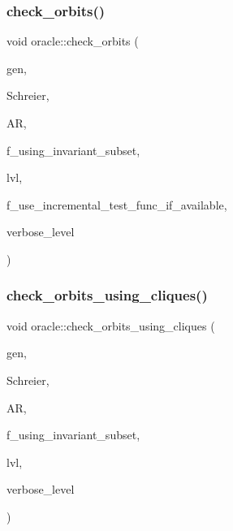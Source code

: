 \subsubsection{\texorpdfstring{check\+\_\+orbits()}{check\_orbits()}}
{\footnotesize\ttfamily void oracle\+::check\+\_\+orbits (\begin{DoxyParamCaption}\item[{\mbox{\hyperlink{classgenerator}{generator}} $\ast$}]{gen,  }\item[{\mbox{\hyperlink{classschreier}{schreier}} \&}]{Schreier,  }\item[{\mbox{\hyperlink{classaction}{action}} \&}]{AR,  }\item[{\mbox{\hyperlink{galois_8h_a09fddde158a3a20bd2dcadb609de11dc}{I\+NT}}}]{f\+\_\+using\+\_\+invariant\+\_\+subset,  }\item[{\mbox{\hyperlink{galois_8h_a09fddde158a3a20bd2dcadb609de11dc}{I\+NT}}}]{lvl,  }\item[{\mbox{\hyperlink{galois_8h_a09fddde158a3a20bd2dcadb609de11dc}{I\+NT}}}]{f\+\_\+use\+\_\+incremental\+\_\+test\+\_\+func\+\_\+if\+\_\+available,  }\item[{\mbox{\hyperlink{galois_8h_a09fddde158a3a20bd2dcadb609de11dc}{I\+NT}}}]{verbose\+\_\+level }\end{DoxyParamCaption})}

\mbox{\label{classoracle_ad967fdd884850e9f6e5e343632912446}} 
\subsubsection{\texorpdfstring{check\+\_\+orbits\+\_\+using\+\_\+cliques()}{check\_orbits\_using\_cliques()}}
{\footnotesize\ttfamily void oracle\+::check\+\_\+orbits\+\_\+using\+\_\+cliques (\begin{DoxyParamCaption}\item[{\mbox{\hyperlink{classgenerator}{generator}} $\ast$}]{gen,  }\item[{\mbox{\hyperlink{classschreier}{schreier}} \&}]{Schreier,  }\item[{\mbox{\hyperlink{classaction}{action}} \&}]{AR,  }\item[{\mbox{\hyperlink{galois_8h_a09fddde158a3a20bd2dcadb609de11dc}{I\+NT}}}]{f\+\_\+using\+\_\+invariant\+\_\+subset,  }\item[{\mbox{\hyperlink{galois_8h_a09fddde158a3a20bd2dcadb609de11dc}{I\+NT}}}]{lvl,  }\item[{\mbox{\hyperlink{galois_8h_a09fddde158a3a20bd2dcadb609de11dc}{I\+NT}}}]{verbose\+\_\+level }\end{DoxyParamCaption})}

